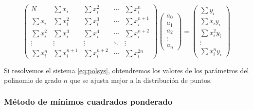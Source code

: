  \begin{equation} \label{eq:polsys}
   \begin{pmatrix}
     N & \sum x_{i} & \sum x_{i}^{2} & \cdots & \sum x_{i}^{n} \\
     \sum x_{i} & \sum x_{i}^{2} & \sum x_{i}^{3} & \cdots & \sum x_{i}^{n+1} \\
     \sum x_{i}^{2} & \sum x_{i}^{3} & \sum x_{i}^{4} & \cdots & \sum x_{i}^{n+2} \\
     \vdots & \vdots & \vdots & \ddots & \vdots \\
     \sum x_{i}^{n} & \sum x_{i}^{n+1} & \sum x_{i}^{n+2} & \cdots & \sum x_{i}^{2n}
    \end{pmatrix}
    \begin{pmatrix}
      a_{0} \\
      a_{1} \\
      a_{2} \\
      \vdots \\
      a_{n}
    \end{pmatrix}
    =
    \begin{pmatrix}
      \sum y_{i} \\
      \sum x_{i}y_{i} \\
      \sum x_{i}^{2}y_{i} \\
      \vdots \\
      \sum x_{i}^{n}y_{i}
    \end{pmatrix}
  \end{equation}

Si resolvemos el sistema \eqref{eq:polsys}, obtendremos los valores de los parámetros del polinomio de grado $n$ que se ajusta mejor a la distribución de puntos.

\subsubsection{Método de mínimos cuadrados ponderado}%


  
